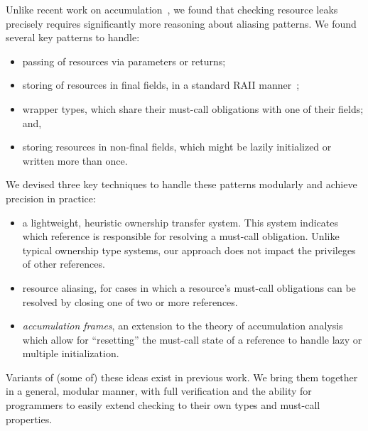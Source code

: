 Unlike recent work on accumulation~\cite{KelloggRSSE2020}, we found
that checking resource leaks precisely requires significantly more
reasoning about aliasing patterns.  We found several key patterns to
handle:
\begin{itemize}
\item passing of resources via parameters or returns;
\item storing of resources in final fields, in a standard RAII manner~\cite{raii};
\item wrapper types, which share their must-call obligations with one of their fields; and,
\item storing resources in non-final fields, which might be lazily initialized or
  written more than once.
\end{itemize}
We devised three key techniques to handle these patterns modularly
and achieve precision in practice:
\begin{itemize}
\item a lightweight, heuristic ownership transfer system. This system
  indicates which reference is responsible for resolving a must-call
  obligation. Unlike typical ownership type systems, our approach does
  not impact the privileges of other references.
\item resource aliasing, for cases in which a resource's must-call obligations
  can be resolved by closing one of two or more references.
\item \emph{accumulation frames}, an extension to the theory of
  accumulation analysis which allow for ``resetting'' the must-call state
  of a reference to handle lazy or multiple initialization.
\end{itemize}
Variants of (some of) these ideas exist in previous work.  We bring
them together in a general, modular manner, with full verification and
the ability for programmers to easily extend checking to their own
types and must-call properties.

